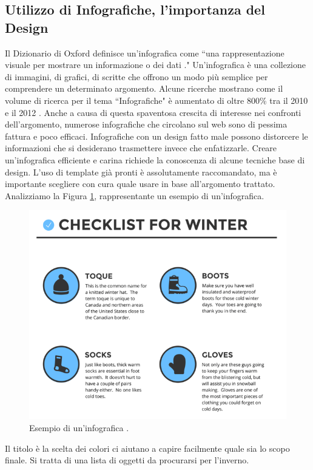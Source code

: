 \subsection{Utilizzo di Infografiche, l'importanza del Design}
\noindent Il Dizionario di Oxford definisce un'infografica come ``una rappresentazione visuale per mostrare un informazione o dei dati \cite{oxofordDictionary}."\newline
Un'infografica è una collezione di immagini, di grafici, di scritte che offrono un modo più semplice per comprendere un determinato argomento.
Alcune ricerche mostrano come il volume di ricerca per il tema ``Infografiche" è aumentato di oltre 800\% tra il 2010 e il 2012 \cite{martech}.\newline
Anche a causa di questa spaventosa crescita di interesse nei confronti dell'argomento, numerose infografiche che circolano sul web sono di pessima fattura e poco efficaci.
Infografiche con un design fatto male possono distorcere le informazioni che si desiderano trasmettere invece che enfatizzarle.
Creare un'infografica efficiente e carina richiede la conoscenza di alcune tecniche base di design.
L'uso di template già pronti è assolutamente raccomandato, ma è importante scegliere con cura quale usare in base all'argomento trattato.
Analizziamo la Figura \ref{infographExample}, rappresentante un esempio di un'infografica.
\begin{figure}[H]
    \centering
    \includegraphics[width=0.9\linewidth]{img/infograpExample.png}
    \caption{Esempio di un'infografica \cite{venngage}.}
    \label{infographExample}
\end{figure}
\noindent Il titolo è la scelta dei colori ci aiutano a capire facilmente quale sia lo scopo finale. Si tratta di una lista di oggetti da procurarsi per l'inverno.\newline
